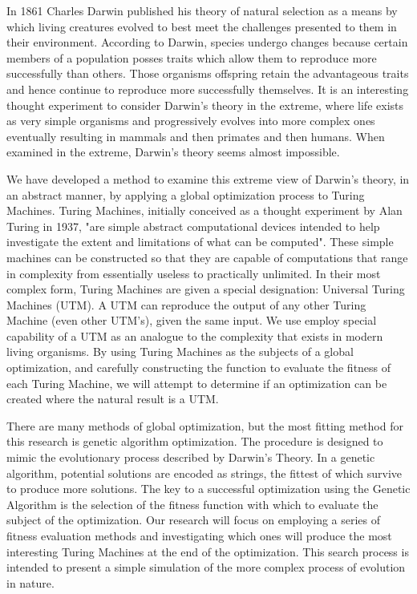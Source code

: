 In 1861 Charles Darwin published his theory of natural selection as a means by which living creatures evolved to best meet the challenges presented to them in their environment. \cite{Origin_of_species} According to Darwin, species undergo changes because certain members of a population posses traits which allow them to reproduce more successfully than others. Those organisms offspring retain the advantageous traits and hence continue to reproduce more successfully themselves. It is an interesting thought experiment to consider Darwin's theory in the extreme, where life exists as very simple organisms and progressively evolves into more complex ones eventually resulting in mammals and then primates and then humans. When examined in the extreme, Darwin's theory seems almost impossible. 

We have developed a method to examine this extreme view of Darwin's theory, in an abstract manner, by applying a global optimization process to Turing Machines. Turing Machines, initially conceived as a thought experiment by Alan Turing in 1937, "are simple abstract computational devices intended to help investigate the extent and limitations of what can be computed". \cite{SEP_turing} These simple machines can be constructed so that they are capable of computations that range in complexity from essentially useless to practically unlimited. In their most complex form, Turing Machines are given a special designation: Universal Turing Machines (UTM). A UTM can reproduce the output of any other Turing Machine (even other UTM's), given the same input. We use employ special capability of a UTM as an analogue to the complexity that exists in modern living organisms. By using Turing Machines as the subjects of a global optimization, and carefully constructing the function to evaluate the fitness of each Turing Machine, we will attempt to determine if an optimization can be created where the natural result is a UTM. 

There are many methods of global optimization, but the most fitting method for this research is genetic algorithm optimization. The procedure is designed to mimic the evolutionary process described by Darwin's Theory. In a genetic algorithm, potential solutions are encoded as strings, the fittest of which survive to produce more solutions. The key to a successful optimization using the Genetic Algorithm is the selection of the fitness function with which to evaluate the subject of the optimization. Our research will focus on employing a series of fitness evaluation methods and investigating which ones will produce the most interesting Turing Machines at the end of the optimization. This search process is intended to present a simple simulation of the more complex process of evolution in nature.

